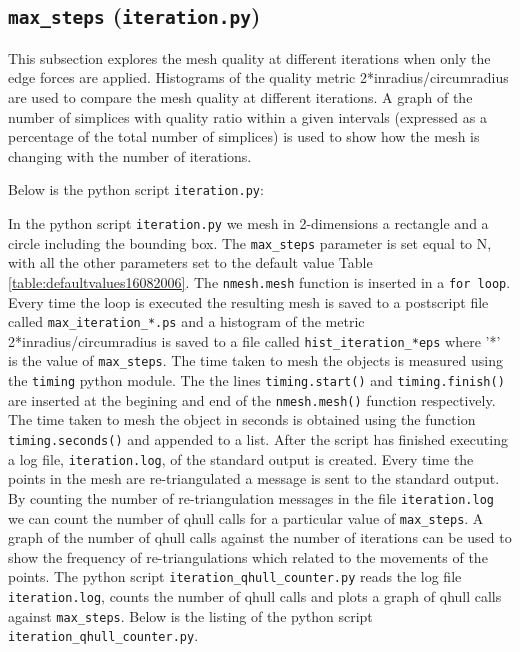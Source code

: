 \documentclass[10pt,a4paper]{book}
\newcommand{\py}[1]{\texttt{\color{blue}#1}}
\begin{document}
\subsection{\texttt{max\_steps} (\texttt{iteration.py})}
\label{sec:maxstep}
This subsection explores the mesh quality at different iterations when only the edge forces are applied.
Histograms of  the quality metric 2*inradius/circumradius are used to
compare the mesh quality at different iterations. A graph of the
number of simplices with quality ratio within a given intervals (expressed as a percentage of the total number of simplices) is
used to show how the mesh is changing with the number of
iterations. 

Below is the python script \texttt{iteration.py}:





In the python script \py{iteration.py} we mesh in 2-dimensions a rectangle and a circle including the bounding box. The \texttt{max\_steps} parameter is set equal to N, with all the other parameters set to the
default value Table \ref{table:defaultvalues16082006}. The \py{nmesh.mesh} function is inserted in a \texttt{for loop}. Every time the loop is executed the resulting mesh is saved to a postscript file called \texttt{max\_iteration\_*.ps} and a histogram of the metric 
2*inradius/circumradius is saved to a file called
\texttt{hist\_iteration\_*eps} where '*' is the value of \texttt{max\_steps}. The time taken to mesh the objects is measured using
the \texttt{timing} python module. The the lines \py{timing.start()} and
\py{timing.finish()} are inserted at the begining and end of the \py{nmesh.mesh()} function respectively. The time taken to mesh the object in seconds is obtained using the function \py{timing.seconds()} and appended to a list. After the script has finished executing a log file, \py{iteration.log}, of the standard output is created. Every time the points in the mesh are re-triangulated a message is sent to the standard output. By counting the number of re-triangulation messages in the file \py{iteration.log} we can count the number of qhull calls for a particular value of \texttt{max\_steps}. A graph of the number
of qhull calls against the number of iterations can be used to show the frequency of re-triangulations which related to the movements of the points.
The python script \py{iteration\_qhull\_counter.py} reads the log file \py{iteration.log}, counts the number of qhull calls and plots a graph of qhull calls against \texttt{max\_steps}. Below is the listing of the python script \py{iteration\_qhull\_counter.py}.
\end{document}
